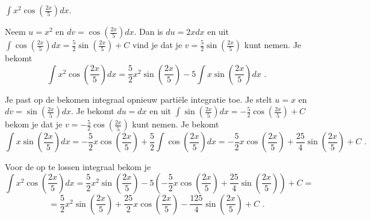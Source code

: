 \begin{voorbeeld}
	$\int x^2 \cos \left( \frac{2x}{5}  \right)dx$.
	
	Neem $u=x^2$ en $dv=\cos \left( \frac{2x}{5}  \right)dx$.
	Dan is $du=2xdx$ en uit $\int \cos \left( \frac{2x}{5}  \right)dx=\frac{5}{2} \sin \left(  \frac{2x}{5} \right)+C$ vind je dat je $v=\frac{5}{2} \sin \left(  \frac{2x}{5} \right)$ kunt nemen.
	Je bekomt
	\[
	\int x^2 \cos \left( \frac{2x}{5}  \right)dx=\frac{5}{2}x^2  \sin \left(  \frac{2x}{5} \right)-5\int x  \sin \left(  \frac{2x}{5} \right)dx \text { .}
	\]
	
	Je past op de bekomen integraal opnieuw parti\"ele integratie toe.
	Je stelt $u=x$ en $dv= \sin \left(  \frac{2x}{5} \right)dx$.
	Je bekomt $du=dx$ en uit $\int  \sin \left(  \frac{2x}{5} \right)dx=-\frac{5}{2}\cos \left(  \frac{2x}{5} \right)+C$ bekom je dat je $v=-\frac{5}{2}\cos \left(  \frac{2x}{5} \right)$ kunt nemen.
	Je bekomt
	\[
	\int x  \sin \left(  \frac{2x}{5} \right)dx=-\frac{5}{2} x \cos \left(  \frac{2x}{5} \right)+\frac{5}{2}\int \cos \left( \frac{2x}{5}  \right)dx=-\frac{5}{2} x \cos \left(  \frac{2x}{5} \right)+\frac{25}{4}\sin \left( \frac{2x}{5} \right)+C \text { .}
	\]
	
	Voor de op te lossen integraal bekom je
	\[
	\int x^2 \cos \left( \frac{2x}{5}  \right)dx=\frac{5}{2}x^2  \sin \left(  \frac{2x}{5} \right)-5\left( -\frac{5}{2} x \cos \left(  \frac{2x}{5} \right)+\frac{25}{4}\sin \left( \frac{2x}{5} \right)   \right)+C=
	\]
	\[
	=\frac{5}{2}x^2  \sin \left(  \frac{2x}{5} \right)+\frac{25}{2} x \cos \left(  \frac{2x}{5} \right)-\frac{125}{4}\sin \left( \frac{2x}{5} \right)  +C \text { .}
	\]\\
\end{voorbeeld}


